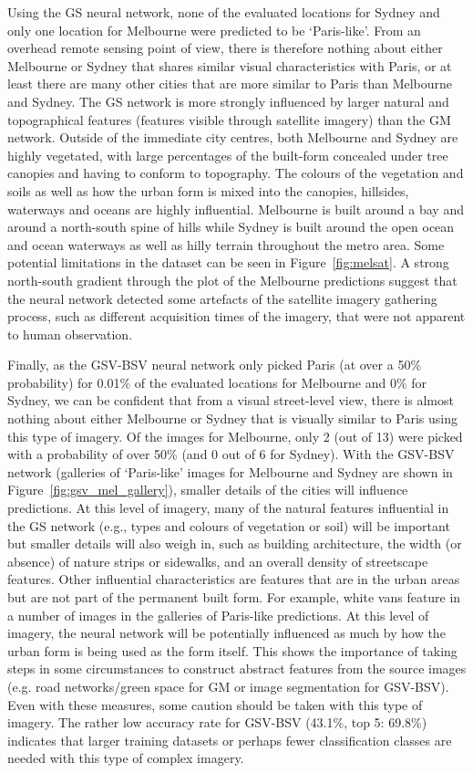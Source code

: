 \documentclass[Crown,sageh,times]{sagej}
\begin{document}
Using the GS neural network, none of the evaluated locations for Sydney and only one location for Melbourne were predicted to be `Paris-like'. From an overhead remote sensing point of view, there is therefore nothing about either Melbourne or Sydney that shares similar visual characteristics with Paris, or at least there are many other cities that are more similar to Paris than Melbourne and Sydney. The GS network is more strongly influenced by larger natural and topographical features (features visible through satellite imagery) than the GM network. Outside of the immediate city centres, both Melbourne and Sydney are highly vegetated, with large percentages of the built-form concealed under tree canopies and having to conform to topography. The colours of the vegetation and soils as well as how the urban form is mixed into the canopies, hillsides, waterways and oceans are highly influential. Melbourne is built around a bay and around a north-south spine of hills while Sydney is built around the open ocean and ocean waterways as well as hilly terrain throughout the metro area. Some potential limitations in the dataset can be seen in Figure~\ref{fig:melsat}. A strong north-south gradient through the plot of the Melbourne predictions suggest that the neural network detected some artefacts of the satellite imagery gathering process, such as different acquisition times of the imagery, that were not apparent to human observation. 

Finally, as the GSV-BSV neural network only picked Paris (at over a 50\% probability) for 0.01\% of the evaluated locations for Melbourne and 0\% for Sydney, we can be confident that from a visual street-level view, there is almost nothing about either Melbourne or Sydney that is visually similar to Paris using this type of imagery. Of the images for Melbourne, only 2 (out of 13) were picked with a probability of over 50\% (and 0 out of 6 for Sydney). With the GSV-BSV network (galleries of `Paris-like' images for Melbourne and Sydney are shown in Figure~\ref{fig:gsv_mel_gallery}), smaller details of the cities will influence predictions. At this level of imagery, many of the natural features influential in the GS network (e.g., types and colours of vegetation or soil) will be important but smaller details will also weigh in, such as building architecture, the width (or absence) of nature strips or sidewalks, and an overall density of streetscape features. Other influential characteristics are features that are in the urban areas but are not part of the permanent built form. For example, white vans feature in a number of images in the galleries of Paris-like predictions. At this level of imagery, the neural network will be potentially influenced as much by how the urban form is being used as the form itself. This shows the importance of taking steps in some circumstances to construct abstract features from the source images (e.g. road networks/green space for GM or image segmentation for GSV-BSV). Even with these measures, some caution should be taken with this type of imagery. The rather low accuracy rate for GSV-BSV (43.1\%, top 5: 69.8\%) indicates that larger training datasets or perhaps fewer classification classes are needed with this type of complex imagery.
\end{document}
